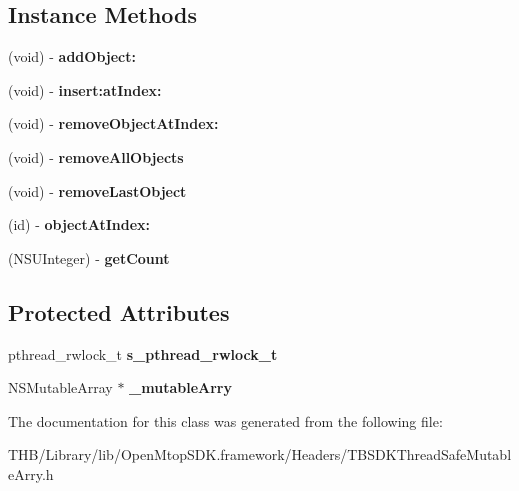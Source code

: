 \subsection*{Instance Methods}
\begin{DoxyCompactItemize}
\item 
\mbox{\label{interface_t_b_s_d_k_thread_safe_mutable_arry_ac565009d3b359de2f959c34e0248d864}} 
(void) -\/ {\bfseries add\+Object\+:}
\item 
\mbox{\label{interface_t_b_s_d_k_thread_safe_mutable_arry_a9e2c92cfe7612ec6abb4593b566dcead}} 
(void) -\/ {\bfseries insert\+:at\+Index\+:}
\item 
\mbox{\label{interface_t_b_s_d_k_thread_safe_mutable_arry_a692f9fc49d60e8608946dc288c3e940c}} 
(void) -\/ {\bfseries remove\+Object\+At\+Index\+:}
\item 
\mbox{\label{interface_t_b_s_d_k_thread_safe_mutable_arry_a0170218858617f98eeb97b7a18031de5}} 
(void) -\/ {\bfseries remove\+All\+Objects}
\item 
\mbox{\label{interface_t_b_s_d_k_thread_safe_mutable_arry_a8540e620af0fae287e8f788cf9b7ceb8}} 
(void) -\/ {\bfseries remove\+Last\+Object}
\item 
\mbox{\label{interface_t_b_s_d_k_thread_safe_mutable_arry_ac41398d70f3c071cb1e7aafda4831112}} 
(id) -\/ {\bfseries object\+At\+Index\+:}
\item 
\mbox{\label{interface_t_b_s_d_k_thread_safe_mutable_arry_ac8cbcdae8bcd8f32cfa968598fd05e47}} 
(N\+S\+U\+Integer) -\/ {\bfseries get\+Count}
\end{DoxyCompactItemize}
\subsection*{Protected Attributes}
\begin{DoxyCompactItemize}
\item 
\mbox{\label{interface_t_b_s_d_k_thread_safe_mutable_arry_a5ff8e63eb5522550f7d63d33d347aeaf}} 
pthread\+\_\+rwlock\+\_\+t {\bfseries s\+\_\+pthread\+\_\+rwlock\+\_\+t}
\item 
\mbox{\label{interface_t_b_s_d_k_thread_safe_mutable_arry_a7da166757c8a1d368415eea542e9724b}} 
N\+S\+Mutable\+Array $\ast$ {\bfseries \+\_\+mutable\+Arry}
\end{DoxyCompactItemize}


The documentation for this class was generated from the following file\+:\begin{DoxyCompactItemize}
\item 
T\+H\+B/\+Library/lib/\+Open\+Mtop\+S\+D\+K.\+framework/\+Headers/T\+B\+S\+D\+K\+Thread\+Safe\+Mutable\+Arry.\+h\end{DoxyCompactItemize}
